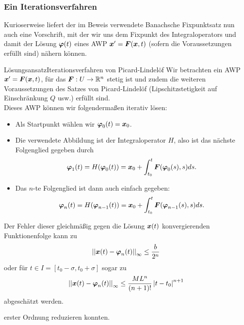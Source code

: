 \subsubsection{Ein Iterationsverfahren}
Kurioserweise liefert der im Beweis verwendete Banachsche Fixpunktsatz nun auch eine Vorschrift, mit der wir uns dem Fixpunkt des Integraloperators und damit der Lösung ${{\text{\boldmath${\varphi}$}}}(t)$ eines AWP ${{\text{\boldmath${x}$}}}'={{\text{\boldmath${F}$}}}({{\text{\boldmath${x}$}}},t)$ (sofern die Voraussetzungen erfüllt sind) nähern können.
\begin{Satz}
{Lösungsansatz}{Iterationsverfahren von Picard-Lindelöf}
Wir betrachten ein AWP ${{\text{\boldmath${x}$}}}'={{\text{\boldmath${F}$}}}({{\text{\boldmath${x}$}}},t)$, für das ${{\text{\boldmath${F}$}}}:U\to\mathbb{R}^n$ stetig ist und zudem die weiteren Voraussetzungen des Satzes von Picard-Lindelöf (Lipschitzstetigkeit auf Einschränkung $Q$ usw.) erfüllt sind.\\
Dieses AWP können wir folgendermaßen iterativ lösen:
\begin{itemize}
    \item Als Startpunkt wählen wir ${{\text{\boldmath${\varphi}$}}}_0(t)={{\text{\boldmath${x}$}}}_0$.
    \item Die verwendete Abbildung ist der Integraloperator $H$, also ist das nächste Folgenglied gegeben durch
    \begin{equation*}
        {{\text{\boldmath${\varphi}$}}}_1(t)=H({{\text{\boldmath${\varphi}$}}}_0(t))={{\text{\boldmath${x}$}}}_0+\int_{t_0}^t{{\text{\boldmath${F}$}}}({{\text{\boldmath${\varphi}$}}}_0(s),s)ds.
    \end{equation*}
    \item Das $n$-te Folgenglied ist dann auch einfach gegeben:
    \begin{equation*}
        {{\text{\boldmath${\varphi}$}}}_n(t)=H({{\text{\boldmath${\varphi}$}}}_{n-1}(t))={{\text{\boldmath${x}$}}}_0+\int_{t_0}^t{{\text{\boldmath${F}$}}}({{\text{\boldmath${\varphi}$}}}_{n-1}(s),s)ds.
    \end{equation*}
\end{itemize}
Der Fehler dieser gleichmäßig gegen die Lösung ${{\text{\boldmath${x}$}}}(t)$ konvergierenden Funktionenfolge kann zu
\begin{equation*}
    \left|\left|{{\text{\boldmath${x}$}}}(t)-{{\text{\boldmath${\varphi}$}}}_n(t)\right|\right|_\infty\leq\frac{b}{2^n}
\end{equation*}
oder für $t\in I=[t_0-\sigma,t_0+\sigma]$ sogar zu
\begin{equation*}
    \left|\left|{{\text{\boldmath${x}$}}}(t)-{{\text{\boldmath${\varphi}$}}}_n(t)\right|\right|_\infty\leq\frac{ML^n}{(n+1)!}\left|{t-t_0}\right|^{n+1}
\end{equation*}
abgeschätzt werden.
\end{Satz}
 erster Ordnung reduzieren konnten.
